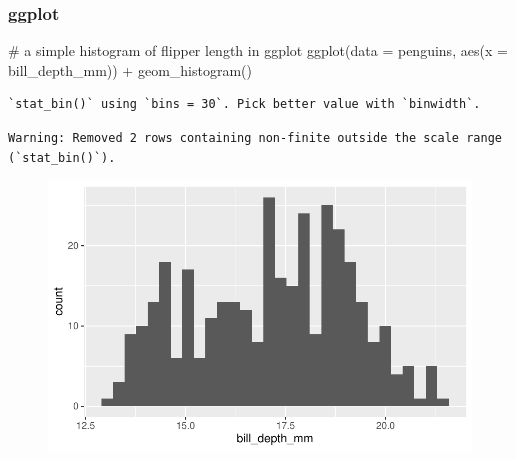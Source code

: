 \documentclass[
  letterpaper,
  DIV=11,
  numbers=noendperiod]{scrreprt}
\newenvironment{Shaded}{\begin{snugshade}}{\end{snugshade}}
\newcommand{\AttributeTok}[1]{\textcolor[rgb]{0.40,0.45,0.13}{#1}}
\newcommand{\CommentTok}[1]{\textcolor[rgb]{0.37,0.37,0.37}{#1}}
\newcommand{\FunctionTok}[1]{\textcolor[rgb]{0.28,0.35,0.67}{#1}}
\newcommand{\NormalTok}[1]{\textcolor[rgb]{0.00,0.23,0.31}{#1}}
\newcommand{\SpecialCharTok}[1]{\textcolor[rgb]{0.37,0.37,0.37}{#1}}
\begin{document}
\begin{tcolorbox}[enhanced jigsaw, left=2mm, colframe=quarto-callout-tip-color-frame, leftrule=.75mm, opacitybacktitle=0.6, toptitle=1mm, title=\textcolor{quarto-callout-tip-color}{\faLightbulb}\hspace{0.5em}{Tip}, opacityback=0, coltitle=black, colbacktitle=quarto-callout-tip-color!10!white, breakable, colback=white, titlerule=0mm, bottomrule=.15mm, arc=.35mm, bottomtitle=1mm, rightrule=.15mm, toprule=.15mm]

\hypertarget{ggplot-7}{%
\subsubsection{ggplot}\label{ggplot-7}}

\begin{Shaded}
\begin{Highlighting}[]
\CommentTok{\# a simple histogram of flipper length in ggplot}
\FunctionTok{ggplot}\NormalTok{(}\AttributeTok{data =}\NormalTok{ penguins, }\FunctionTok{aes}\NormalTok{(}\AttributeTok{x =}\NormalTok{ bill\_depth\_mm)) }\SpecialCharTok{+}
  \FunctionTok{geom\_histogram}\NormalTok{() }
\end{Highlighting}
\end{Shaded}

\begin{verbatim}
`stat_bin()` using `bins = 30`. Pick better value with `binwidth`.
\end{verbatim}

\begin{verbatim}
Warning: Removed 2 rows containing non-finite outside the scale range
(`stat_bin()`).
\end{verbatim}

\begin{figure}[H]

{\centering \includegraphics{scripts/02_dataViz/class4_files/figure-pdf/histogram2-1.pdf}

}
\end{figure}
\end{tcolorbox}
\end{document}
